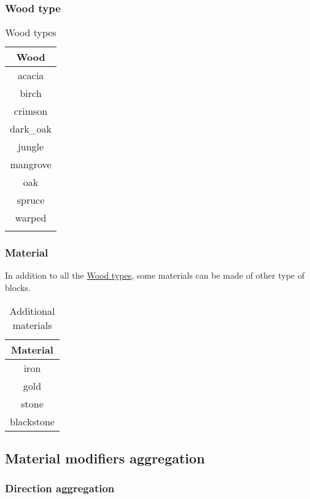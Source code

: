 \subsubsection{Wood type}\label{ab:wood}

\begin{longtable}{ |c| }
	\hline
	Wood \\
	\hline
	\endhead
	acacia \\
	birch \\
	crimson \\
	dark\_oak \\
	jungle \\
	mangrove \\
	oak \\
	spruce \\
	warped \\
	\hline
	\caption{Wood types}
\end{longtable}

\subsubsection{Material}
In addition to all the \hyperref[ab:wood]{Wood types}, some materials can be made of other type of blocks.

\begin{table}[H]
	\centering
	\begin{tabular}{ |c| }
		\hline
		Material \\
		\hline
		iron \\
		gold \\
		stone \\
		blackstone \\
		\hline
	\end{tabular}
	\caption{Additional materials}
\end{table}


\subsection{Material modifiers aggregation}

\subsubsection{Direction aggregation}

